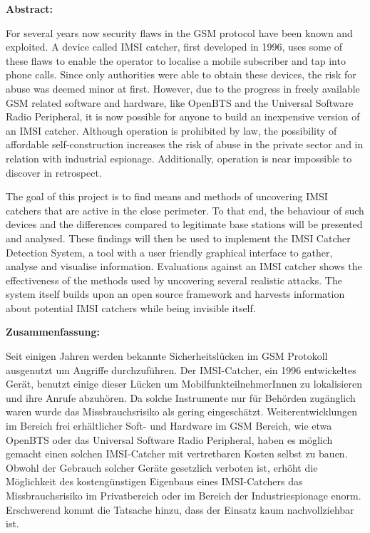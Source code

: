 \begin{center}
\textbf{Abstract:}\\
\vspace{.1cm}
\end{center}
For several years now security flaws in the GSM protocol have been known and exploited.
A device called IMSI catcher, first developed in 1996, uses some of these flaws to enable the operator to localise a mobile subscriber and tap into phone calls.
Since only authorities were able to obtain these devices, the risk for abuse was deemed minor at first.
However, due to the progress in freely available GSM related software and hardware, like OpenBTS and the Universal Software Radio Peripheral, it is now possible for anyone to build an inexpensive version of an IMSI catcher.
Although operation is prohibited by law, the possibility of affordable self-construction increases the risk of abuse in the private sector and in relation with industrial espionage.
Additionally, operation is near impossible to discover in retrospect.

The goal of this project is to find means and methods of uncovering IMSI catchers that are active in the close perimeter.
To that end, the behaviour of such devices and the differences compared to legitimate base stations will be presented and analysed.
These findings will then be used to implement the IMSI Catcher Detection System, a tool with a user friendly graphical interface to gather, analyse and visualise information.
Evaluations against an IMSI catcher shows the effectiveness of the methods used by uncovering several realistic attacks.
The system itself builds upon an open source framework and harvests information about potential IMSI catchers while being invisible itself.
\vspace{.5cm}
\newpage
\begin{center}
\textbf{Zusammenfassung:}\\
\vspace{.1cm}
\end{center}
Seit einigen Jahren werden bekannte Sicherheitsl\"ucken im GSM Protokoll ausgenutzt um Angriffe durchzuf\"uhren.
Der IMSI-Catcher, ein 1996 entwickeltes Ger\"at, benutzt einige dieser L\"ucken um MobilfunkteilnehmerInnen zu lokalisieren und ihre Anrufe abzuh\"oren.
Da solche Instrumente nur f\"ur Beh\"orden zug\"anglich waren wurde das Missbrauchsrisiko als gering eingesch\"atzt.
Weiterentwicklungen im Bereich frei erh\"altlicher Soft- und Hardware im GSM Bereich, wie etwa OpenBTS oder das Universal Software Radio Peripheral, haben es m\"oglich gemacht einen solchen IMSI-Catcher mit vertretbaren Kosten selbst zu bauen.
Obwohl der Gebrauch solcher Ger\"ate gesetzlich verboten ist, erhöht die Möglichkeit des kostengünstigen Eigenbaus eines IMSI-Catchers das Missbrauchsrisiko im Privatbereich oder im Bereich der Industriespionage enorm.
Erschwerend kommt die Tatsache hinzu, dass der Einsatz kaum nachvollziehbar ist.

